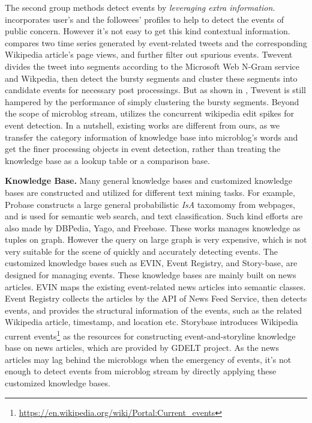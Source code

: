 \documentclass[runningheads,a4paper]{llncs}
\theoremstyle{exampstyle}
\begin{document}
The second group methods detect events by \textit{leveraging extra information}. 
\cite{huang2016efficient} incorporates user's and the followees' profiles to help to detect the events of public concern. 
However it's not easy to get this kind contextual information.
\cite{osborne2012bieber} compares two time series generated by event-related tweets and the corresponding Wikipedia article's page views, and further filter out spurious events.
Twevent \cite{Twevent2012} divides the tweet into segments according to the Microsoft Web N-Gram service and Wikpedia, then detect the bursty segments and cluster these segments into candidate events for necessary post processings.
But as shown in \cite{Yan:2015wm}, Twevent is still hampered by the performance of simply clustering the bursty segments.
Beyond the scope of microblog stream, \cite{steiner2013mj} utilizes the concurrent wikipedia edit spikes for event detection.
In a nutshell, existing works are different from ours, as we transfer the category information of knowledge base into microblog's words and get the finer processing objects in event detection, rather than treating the knowledge base as a lookup table or a comparison base.

\textbf{Knowledge Base.} Many general knowledge bases and customized knowledge bases are constructed and utilized for different text mining tasks. 
For example, Probase\cite{wu2012probase} constructs a large general probabilistic \textit{IsA} taxomomy from webpages, and is used for semantic web search, and text classification\cite{wang2014concept}.
Such kind efforts are also made by DBPedia\cite{auer2007dbpedia}, Yago\cite{fabian2007yago}, and Freebase\cite{bollacker2008freebase}. 
These works manages knowledge as tuples on graph. 
However the query on large graph is very expensive\cite{huang2011scalable}, which is not very suitable for the scene of quickly and accurately detecting events.
The customized knowledge bases such as EVIN\cite{kuzey2014evin}, Event Registry\cite{leban2014eventRegistry}, and Story-base\cite{wu2015storybase}, are designed for managing events.
These knowledge bases are mainly built on news articles.
EVIN maps the existing event-related news articles into semantic classes. 
Event Registry collects the articles by the API of News Feed Service\cite{trampuvs2012newsfeed}, then detects events, and provides the structural information of the events, such as the related Wikipedia article, timestamp, and location etc. 
Storybase introduces Wikipedia current events\footnote{\url{https://en.wikipedia.org/wiki/Portal:Current_events}} as the resources for constructing event-and-storyline knowledge base on news articles, which are provided by GDELT project\cite{leetaru2013gdelt}.
As the news articles may lag behind the microblogs when the emergency of events, it's not enough to detect events from microblog stream by directly applying these customized knowledge bases. 
\end{document}

